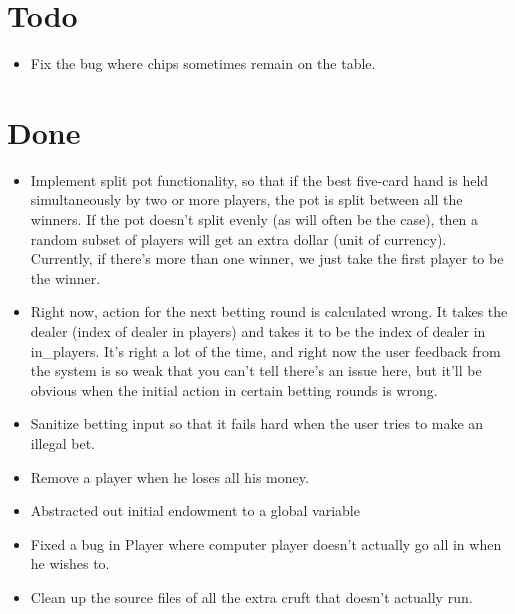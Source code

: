 \documentclass{article}
\begin{document}
\section*{Todo}
\begin{itemize}
\item Fix the bug where chips sometimes remain on the table.
\end{itemize}

\section*{Done}
\begin{itemize}
\item \CheckedBox Implement split pot functionality, so that if the best five-card
  hand is held simultaneously by two or more players, the pot is split
  between all the winners. If the pot doesn't split evenly (as will
  often be the case), then a random subset of players will get an
  extra dollar (unit of currency). Currently, if there's more than one
  winner, we just take the first player to be the winner.
\item \CheckedBox Right now, action for the next betting round is calculated
  wrong. It takes the dealer (index of dealer in players) and takes it
  to be the index of dealer in in\_players. It's right a lot of the
  time, and right now the user feedback from the system is so weak
  that you can't tell there's an issue here, but it'll be obvious when
  the initial action in certain betting rounds is wrong.
\item \CheckedBox Sanitize betting input so that it fails hard when the user tries
  to make an illegal bet.
\item \CheckedBox Remove a player when he loses all his money.
\item \CheckedBox Abstracted out initial endowment to a global variable
\item \CheckedBox Fixed a bug in Player where computer player doesn't
  actually go all in when he wishes to.
\item \CheckedBox Clean up the source files of all the extra cruft that doesn't actually run.
\end{itemize}
\end{document}
